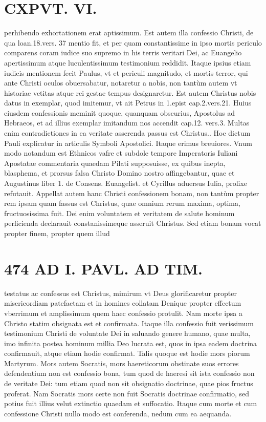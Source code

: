 \documentclass{article}
\begin{document}
\begin{pages}
\section*{CXPVT. VI. }
\marginpar{[ p.473 ]}\pstart perhibendo exhortationem erat aptissimum. Est autem illa confessio Christi, de qua loan.18.vers. 37 mentio fit, et per quam constantissime in ipso mortis periculo comparens coram iudice suo supremo in his terris veritari Dei, ac Euangelio apertissimum atque luculentissimum testimonium reddidit. Itaque ipsius etiam iudicis mentionem fecit Paulus, vt et periculi magnitudo, et mortis terror, qui ante Christi oculos obuersabatur, notaretur a nobis, non tantùm autem vt historiae vetitas atque  rei gestae tempus designaretur. Est autem Christus nobis datus in exemplar, quod imitemur, vt ait Petrus in 1.epist cap.2.vers.21. Huius eiusdem confessionis meminit quoque, quanquam obscurius, Apostolus ad Hebraeos, et ad illius exemplar imitandum nos accendit cap.12. vers.3. Multas enim contradictiones in ea veritate asserenda passus est Christus.. Hoc dictum Pauli explicatur in articulis Symboli Apostolici. Itaque erimus breuiores. Vnum modo notandum est Ethnicos vafre et subdole tempore Imperatoris Iuliani Apostatae commentaria quaedam Pilati supposuisse, ex quibus inepta, blasphema, et prorsus falsa Christo Domino nostro affingebantur, quae et Augustinus liber 1. de Consens. Euangelist. et Cyrillus aduersus Iulia, prolixe refutauit. Appellat autem hanc Christi confessionem bonam, non tantùm propter rem ipsam quam fassus est Christus, quae omnium rerum maxima, optima, fructuosissima fuit. Dei enim voluntatem et veritatem de salute hominum perficienda declarauit constanissimeque asseruit Christus. Sed etiam bonam vocat propter finem, propter quem illud  \pend
\section*{474 AD I. PAVL. AD TIM. }
\marginpar{[ p.]}\pstart testatus ac confessus est Christus, mimirum vt Deus glorificaretur propter misericordiam patefactam et in homines collatam Denique propter effectum vberrimum et amplissimum quem haec confessio protulit. Nam morte ipsa a Christo statim obsignata est et confirmata. Itaque illa confessio fuit verissimum testimonium Christi de voluntate Dei in saluando genere humano, quae multa, imo infinita postea hominum millia Deo lucrata est, quos in ipsa eadem doctrina confirmauit, atque etiam hodie confirmat. Talis quoque est hodie mors piorum Martyrum. Mors autem Socratis, mors haereticorum obstinate suos errores defendentium non est confessio bona, tum quod de haeresi sit ista confessio non de veritate Dei: tum etiam quod non sit obsignatio doctrinae, quae pios fructus proferat. Nam Socratis mors certe non fuit Socratis doctrinae confirmatio, sed potius fuit illius velut extinctio quaedam et suffocatio. Itaque cum morte et cum confessione Christi nullo modo est conferenda, nedum cum ea aequanda.  \pend
{}
{}

\end{pages}
\end{document}
